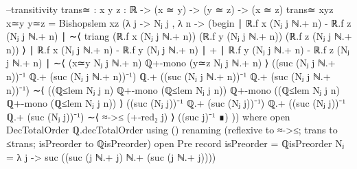 \documentclass[11pt,a4paper]{article}
\begin{document}
\begin{code}
  --transitivity
  trans≃ : {x y z : ℝ} -> (x ≃ y) -> (y ≃ z) -> (x ≃ z)
  trans≃ {x}{y}{z} x≃y y≃z = Bishopslem {x}{z} (λ {j} -> 
    Nⱼ {j} , λ {n} -> (begin 
    ∣ ℝ.f x (Nⱼ {j} ℕ.+ n) - ℝ.f z (Nⱼ {j} ℕ.+ n) ∣ 
      ∼⟨ triang (ℝ.f x (Nⱼ {j} ℕ.+ n)) (ℝ.f y (Nⱼ {j} ℕ.+ n)) (ℝ.f z (Nⱼ {j} ℕ.+ n)) ⟩
    ∣ ℝ.f x (Nⱼ {j} ℕ.+ n) - ℝ.f y (Nⱼ {j} ℕ.+ n) ∣ + 
    ∣ ℝ.f y (Nⱼ {j} ℕ.+ n) - ℝ.f z (Nⱼ {j} ℕ.+ n) ∣
    ∼⟨ (x≃y {Nⱼ {j} ℕ.+ n}) ℚ+-mono (y≃z {Nⱼ {j} ℕ.+ n}) ⟩ 
    ((suc (Nⱼ {j} ℕ.+ n))⁻¹ ℚ.+ (suc (Nⱼ {j} ℕ.+ n))⁻¹) ℚ.+ 
    ((suc (Nⱼ {j} ℕ.+ n))⁻¹ ℚ.+ (suc (Nⱼ {j} ℕ.+ n))⁻¹)
    ∼⟨ ((ℚ≤lem {Nⱼ {j}} {n}) ℚ+-mono (ℚ≤lem {Nⱼ {j}} {n})) 
           ℚ+-mono 
         ((ℚ≤lem {Nⱼ {j}} {n}) ℚ+-mono (ℚ≤lem {Nⱼ {j}} {n})) ⟩ 
    ((suc (Nⱼ {j}))⁻¹ ℚ.+ (suc (Nⱼ {j}))⁻¹) ℚ.+ 
    ((suc (Nⱼ {j}))⁻¹ ℚ.+ (suc (Nⱼ {j}))⁻¹) 
    ∼⟨ ≈->≤ (+-red₂ j) ⟩ 
    ((suc j)⁻¹ ∎) ))
    where
      open DecTotalOrder ℚ.decTotalOrder using () 
        renaming (reflexive to ≈->≤; trans to ≤trans; isPreorder to ℚisPreorder)
      open Pre record {isPreorder = ℚisPreorder}
      Nⱼ = λ {j} -> suc ((suc (j ℕ.+ j) ℕ.+ (suc (j ℕ.+ j))))
\end{code}


\end{document}

